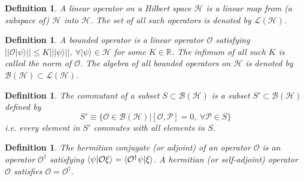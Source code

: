 \documentclass[a4paper,11pt]{article}
\newtheorem{defn}[thm]{Definition}
\newcommand{\ket}[1]{| #1 \rangle } %
\newcommand{\braket}[2]{\langle  #1 \vphantom{#2} | #2 \vphantom{#1} \rangle } %
\renewcommand{\=}[1]{\stackrel{#1}{=}} %
\def\B{\mathcal{B}}
\def\O{\mathcal{O}}
\def\P{\mathcal{P}}
\def\L{\mathcal{L}}
\def\H{\mathcal{H}}
\begin{document}
%	







\begin{defn}
	A linear operator on a Hilbert space $\H$ is a linear map from (a subspace of) $\H$ into $\H$. The set of all such operators is denoted by $\L(\H)$.
\end{defn}


\begin{defn}
	A bounded operator is a linear operator $\O$ satisfying $||\O\ket{\psi}||\leq K||\ket{\psi}||,~\forall\ket{\psi}\in\H$ for some $K\in\mathbb{R}$. The infimum of all such $K$ is called the norm of $\O$. The algebra of all bounded operators on $\H$ is denoted by $\B(\H)\subset \L(\H)$.
\end{defn}


\begin{defn}
	The commutant of a subset $S\subset \B(\H)$ is a subset $S'\subset \B(\H)$ defined by
	\begin{equation}
		S'\equiv\{\O\in\B(\H)|[\O,\P]=0,~\forall \P\in S\}
	\end{equation}
	i.e. every element in $S'$ commutes with all elements in $S$.
\end{defn}




\begin{defn}
	The hermitian conjugate (or adjoint) of an operator $\O$ is an operator $\O^\dagger$ satisfying $\braket{\psi}{\O\xi}=\braket{\O^\dagger \psi}{\xi}$. A hermitian (or self-adjoint) operator $\O$ satisfies $\O=\O^\dagger$.
\end{defn}
\end{document}
